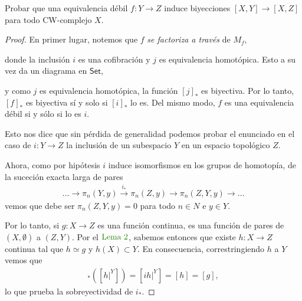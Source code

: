 \documentclass[11pt]{article}
\newcommand{\cat}[1]{\mathsf{#1}}
\newcommand{\paint}[1]{\color{color}{#1}}
\newenvironment{exercise}[2][Ejercicio]{\begin{trivlist}
\item[\hskip \labelsep \paint{{\bfseries #1}}\hskip \labelsep {\bfseries #2.}]}{\end{trivlist}}
\begin{document}
\begin{exercise}{4} Probar que una equivalencia débil $f : Y \to Z$ induce biyecciones $[X,Y] \to [X,Z]$ para todo CW-complejo $X$.
\end{exercise}
\begin{proof} En primer lugar, notemos que $f$ \textit{se factoriza a través} de $M_f$, 
\begin{center}
\end{center}
donde la inclusión $i$ es una cofibración y $j$ es equivalencia homotópica. Esto a su vez da un diagrama en $\cat{Set}$,
\begin{center}
\end{center}

y como $j$ es equivalencia homotópica, la función $[j]_*$ es biyectiva. Por lo tanto, $[f]_*$ es biyectiva sí y solo si $[i]_*$ lo es. Del mismo modo, $f$ es una equivalencia débil si y sólo si lo es $i$. 

Esto nos dice que sin pérdida de generalidad podemos probar el enunciado en el caso de $i : Y \to Z$ la inclusión de un subespacio $Y$ en un espacio topológico $Z$.

Ahora, como por hipótesis $i$ induce isomorfismos en los grupos de homotopía, de la suceción exacta larga de pares
\begin{align*}
\dots \to \pi_n(Y,y) \xrightarrow{i_*} \pi_n(Z,y) \to \pi_n(Z,Y,y) \to \dots
\end{align*}
vemos que debe ser $\pi_n(Z,Y,y) = 0$ para todo $n \in N$ e $y \in Y$.	

Por lo tanto, si $g : X \to Z$ es una función continua, es una función de pares de $(X, \emptyset)$ a $(Z,Y)$. Por el $\paint{\text{Lema $2$}}$, sabemos entonces que existe $h : X \to Z$ continua tal que $h \simeq g$ y $h(X) \subset Y$. En consecuencia, correstringiendo $h$ a $Y$ vemos que
\begin{align*}
[i]_*\left([h|^Y]\right) = [ih|^Y] = [h] =  [g],
\end{align*}
lo que prueba la sobreyectividad de $i_*$.


\end{proof}
\end{document}
